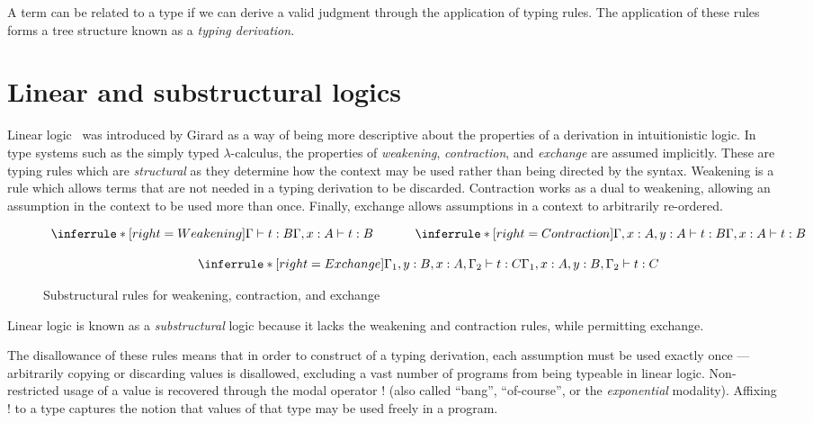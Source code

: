 A term can be related to a type if we can derive a valid judgment through the
application of typing rules. The application of these rules forms a tree
structure known as a \textit{typing derivation}.


\section{Linear and substructural logics}
Linear logic~\cite{} was introduced by Girard as a way of being more descriptive
about the properties of a derivation in intuitionistic logic. In type systems
such as the simply typed $\lambda$-calculus, the properties of
\textit{weakening}, \textit{contraction}, and \textit{exchange} are assumed
implicitly. These are typing rules which are \textit{structural} as they
determine how the context may be used rather than being directed by the syntax.
Weakening is a rule which allows terms that are not needed in a typing
derivation to be discarded. Contraction works as a dual to weakening, allowing
an assumption in the context to be used more than once. Finally, exchange allows
assumptions in a context to arbitrarily re-ordered.


\begin{figure}[H]
  \begin{align*}
  \begin{array}{c}
    \inferrule*[right=Weakening]{\Gamma \vdash t : B}{\Gamma, x : A \vdash t : B}
    \;\;\;\;
    \;\;\;\;
    \;\;\;\;
    \inferrule*[right=Contraction]{\Gamma, x : A, y : A \vdash t : B}{\Gamma, x : A \vdash t : B}
    \\\\
    \inferrule*[right=Exchange]{\Gamma_{1}, y : B, x : A, \Gamma_{2} \vdash t : C} {\Gamma_{1}, x : A, y : B, \Gamma_{2} \vdash t : C}
    \end{array}
  \end{align*}
  \caption{Substructural rules for weakening, contraction, and exchange}
\end{figure}

Linear logic is known as a \textit{substructural} logic because it lacks the weakening
and contraction rules, while permitting exchange.

The disallowance of these rules means that in order to construct of a typing
derivation, each assumption must be used exactly once --- arbitrarily copying or
discarding values is disallowed, excluding a vast number of programs from being
typeable in linear logic. Non-restricted usage of a value is recovered through
the modal operator $!$ (also called ``bang'', ``of-course'', or the
\textit{exponential} modality). Affixing $!$ to a type captures the notion that values of
that type may be used freely in a program.

